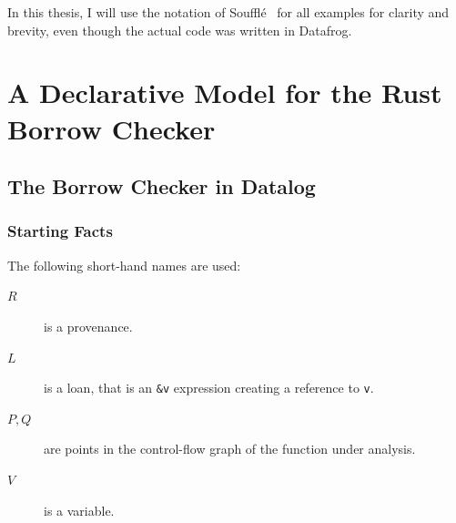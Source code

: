 \documentclass[11pt,a4paper,twoside,openany]{report}
\newcommand{\fixme}[1] {{\color{red}#1}}
\newcommand{\InRust}[1]{\texttt{#1}}
\begin{document}
In this thesis, I will use the notation of Souffl{\'e}~\cite{scholz_fast_2016}
for all examples for clarity and brevity, even though the actual code was
written in Datafrog.

\chapter{A Declarative Model for the Rust Borrow Checker}
\label{cha:investigation}

\section{The Borrow Checker in Datalog}

\subsection{Starting Facts}
\label{sec:input-facts}

The following short-hand names are used:
\begin{description}
\item[$R$] is a provenance.
\item[$L$] is a loan, that is an \InRust{&v} expression creating a reference
  to \InRust{v}.
\item[$P, Q$] are points in the control-flow graph of the function under analysis.
\item[$V$] is a variable.
\end{description}
\end{document}
